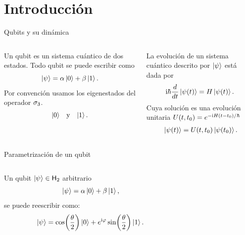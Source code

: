 \section{Introducción}

\begin{frame}{Qubits y su dinámica}
    \begin{columns}
        \begin{column}{0.5\textwidth}
            \begin{center}
                Un qubit es un sistema cuántico de dos estados.
                \pause
                Todo qubit se puede escribir como
                \begin{equation}
                    \ket{\psi}=\alpha\ket{0}+\beta\ket{1}.\nonumber
                \end{equation}
                \pause
                Por convención usamos los eigenestados del operador $\sigma_{3}$.
                \begin{align}
                    \ket{0} & & \text{y} & & \ket{1}. \nonumber
                \end{align} 
            \end{center}
        \end{column}
        \pause
        \begin{column}{0.5\textwidth}
            La evolución de un sistema cuántico descrito por $\ket{\psi}$ está dada por
            \begin{equation}
                \text{i}\hbar\frac{d}{dt}\ket{\psi(t)}=H\ket{\psi(t)}.\nonumber
            \end{equation}
            \pause
            Cuya solución es una evolución unitaria $U(t,t_{0})=e^{-\text{i} H(t-t_{0})/\hbar}$
            \begin{align}
                \ket{\psi(t)}=U(t,t_{0})\ket{\psi(t_{0})} \rlap{.}\nonumber
            \end{align}
        \end{column}
    \end{columns}
\end{frame}
\begin{frame}{Parametrización de un qubit}
    \begin{columns}
        \begin{column}{0.5\textwidth}
            Un qubit $\ket{\psi}\in{\sf H}_{2}$ arbitrario
            \begin{equation}
                \ket{\psi}=\alpha\ket{0}+\beta\ket{1},\nonumber
            \end{equation}
            \pause
            se puede reescribir como:
            \begin{equation}
                \ket{\psi}=\cos(\frac{\theta}{2})\ket{0}+e^{\text{i}\varphi}\sin(\frac{\theta}{2})\ket{1}.\nonumber
            \end{equation}
        \end{column}
        \begin{column}{0.5\textwidth}
            \centering
            \BlochSphere
        \end{column}
    \end{columns}
\end{frame}
